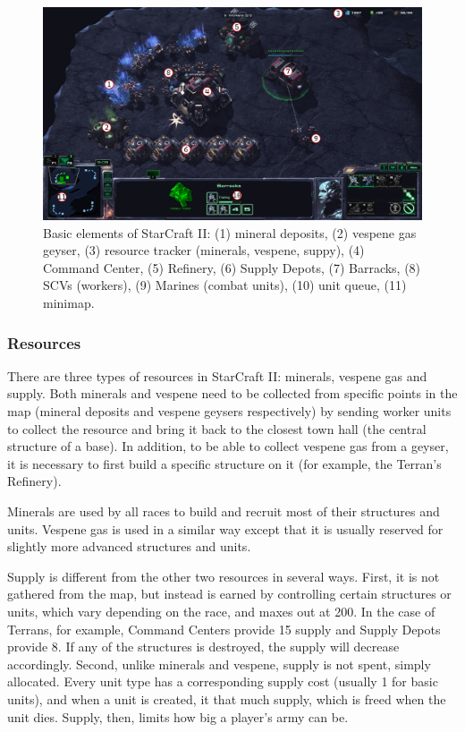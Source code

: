 \begin{figure}[t]
    \centering
    \includegraphics[width=1\textwidth]{figs/SC2_basic_elements.png}
    \caption[Basic elements of StarCraft II]{Basic elements of StarCraft II: (1) mineral deposits, (2) vespene gas geyser, (3) resource tracker (minerals, vespene, suppy), (4) Command Center, (5) Refinery, (6) Supply Depots, (7) Barracks, (8) SCVs (workers), (9) Marines (combat units), (10) unit queue, (11) minimap.}
    \label{fig:sc2_screenshot}
\end{figure}

\subsubsection{Resources}

There are three types of resources in StarCraft II: minerals, vespene gas and supply. Both minerals and vespene need to be collected from specific points in the map (mineral deposits and vespene geysers respectively) by sending worker units to collect the resource and bring it back to the closest town hall (the central structure of a base). In addition, to be able to collect vespene gas from a geyser, it is necessary to first build a specific structure on it (for example, the Terran's Refinery).

Minerals are used by all races to build and recruit most of their structures and units. Vespene gas is used in a similar way except that it is usually reserved for slightly more advanced structures and units.

Supply is different from the other two resources in several ways. First, it is not gathered from the map, but instead is earned by controlling certain structures or units, which vary depending on the race, and maxes out at 200. In the case of Terrans, for example, Command Centers provide 15 supply and Supply Depots provide 8. If any of the structures is destroyed, the supply will decrease accordingly. Second, unlike minerals and vespene, supply is not spent, simply allocated. Every unit type has a corresponding supply cost (usually 1 for basic units), and when a unit is created, it  that much supply, which is freed when the unit dies. Supply, then, limits how big a player's army can be.

